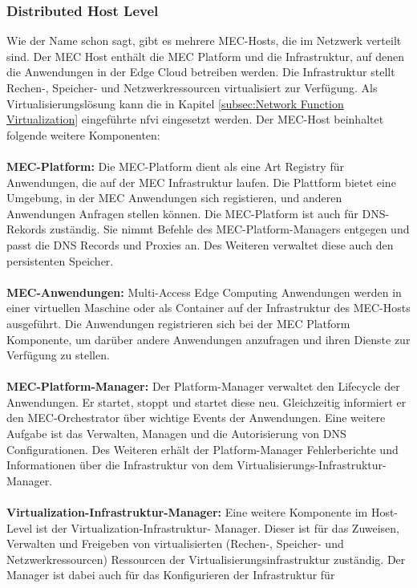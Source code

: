 \documentclass[runningheads]{llncs}
\numberwithin{figure}{section}
\begin{document}
\subsubsection{Distributed Host Level}
Wie der Name schon sagt, gibt es mehrere MEC-Hosts, die im Netzwerk verteilt sind.
Der MEC Host enthält die MEC Platform und die Infrastruktur, auf denen die Anwendungen in der Edge Cloud betreiben werden.
Die Infrastruktur stellt Rechen-, Speicher- und Netzwerkressourcen virtualisiert zur Verfügung. Als Virtualisierungslösung kann
die in Kapitel \ref{subsec:Network Function Virtualization} eingeführte \acrlong{nfvi}
eingesetzt werden. Der MEC-Host beinhaltet folgende weitere Komponenten:
\\
\\
\textbf{MEC-Platform:} Die MEC-Platform dient als eine Art Registry für  
Anwendungen, die auf der MEC Infrastruktur laufen. Die Plattform bietet eine Umgebung, in der MEC Anwendungen sich registieren,
und anderen Anwendungen Anfragen stellen können. Die MEC-Platform ist auch für DNS-Rekords zuständig. Sie nimmt Befehle
des MEC-Platform-Managers entgegen und passt die DNS Records und Proxies an. Des Weiteren verwaltet diese auch den persistenten Speicher.
\\
\\
\textbf{MEC-Anwendungen:} Multi-Access Edge Computing Anwendungen werden in einer virtuellen Maschine oder als
Container auf der Infrastruktur des MEC-Hosts ausgeführt. Die Anwendungen registrieren sich bei der MEC Platform
Komponente, um darüber andere Anwendungen anzufragen und ihren Dienste zur Verfügung zu stellen. \cite{DevelopingSoftwareMultiAccess}
\\
\\
\textbf{MEC-Platform-Manager:} Der Platform-Manager verwaltet den Lifecycle der Anwendungen. Er startet, stoppt und startet diese neu.
Gleichzeitig informiert er den MEC-Orchestrator über wichtige Events der Anwendungen. 
Eine weitere Aufgabe ist das Verwalten, Managen und die Autorisierung von DNS Configurationen.
Des Weiteren erhält der Platform-Manager Fehlerberichte und Informationen über die Infrastruktur von dem Virtualisierungs-Infrastruktur-Manager.
\\
\\ 
\textbf{Virtualization-Infrastruktur-Manager:} Eine weitere Komponente im Host-Level ist der Virtualization-Infrastruktur-
Manager. Dieser ist für das Zuweisen, Verwalten und Freigeben von virtualisierten (Rechen-, Speicher- und Netzwerkressourcen)
Ressourcen der Virtualisierungsinfrastruktur zuständig. Der Manager ist dabei auch für das Konfigurieren der Infrastruktur für 
\end{document}
